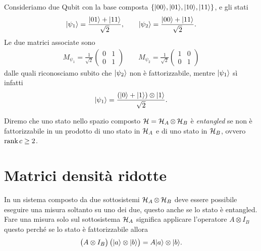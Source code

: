 \begin{example}
  Consideriamo due Qubit con la base composta $ \{\vert 00 \rangle, \vert 01 \rangle, \vert 10 \rangle, \vert 11 \rangle\} $, e gli stati
  \begin{align*}
    \vert \psi_1 \rangle = \frac{\vert 01 \rangle + \vert 11 \rangle}{\sqrt{2}}, \qquad \vert \psi_2 \rangle = \frac{\vert 00 \rangle + \vert 11 \rangle}{\sqrt{2}}.
  \end{align*}
  Le due matrici associate sono 
  \begin{align*}
    M_{\psi_1} = \frac1{\sqrt{2}}
    \begin{pmatrix}
      0 & 1 \\
      0 & 1 
    \end{pmatrix}
    \qquad     M_{\psi_2} = \frac1{\sqrt{2}}
    \begin{pmatrix}
      1 & 0 \\
      0 & 1 
    \end{pmatrix}
  \end{align*}
  dalle quali riconosciamo subito che $ \vert \psi_2 \rangle $ non è fattorizzabile, mentre $ \vert \psi_1 \rangle $ sì infatti 
  \begin{align*}
    \vert \psi_1 \rangle = \frac{(\vert 0 \rangle + \vert 1 \rangle) \otimes \vert 1 \rangle}{\sqrt{2}}.
  \end{align*}
\end{example}

Diremo che uno stato nello spazio composto $ \operatorname{\mathcal{H}} = \operatorname{\mathcal{H}}_A \otimes \operatorname{\mathcal{H}}_B $ è \textit{entangled} se non è fattorizzabile in un prodotto di uno stato in $ \operatorname{\mathcal{H}}_A $ 
e di uno stato in $ \operatorname{\mathcal{H}}_B $, ovvero $ \operatorname{\textnormal{rank}} c \geq 2 $.

\section{Matrici densità ridotte}

In un sistema composto da due sottosistemi $ \operatorname{\mathcal{H}}_A \otimes \operatorname{\mathcal{H}}_B $ deve essere possibile eseguire una misura soltanto su uno dei due, questo anche se 
lo stato è entangled. Fare una misura solo sul sottosistema $ \operatorname{\mathcal{H}}_A $ significa applicare l'operatore $ A \otimes I_B $ questo perché se lo stato è 
fattorizzabile allora 
\begin{align*}
  \left(\phb A \otimes I_B \right) \left(\phb \k{a} \otimes \k{b} \right) = A\k{a} \otimes \k{b}.
\end{align*}

